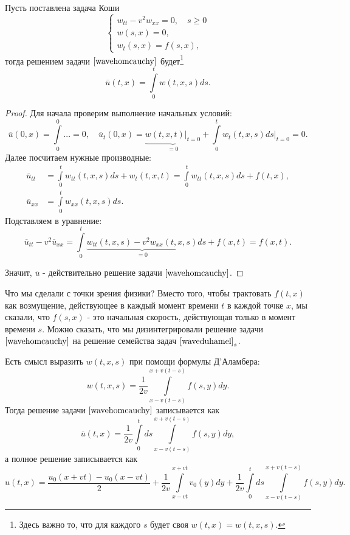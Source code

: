 \begin{theorem}[Дюамель] Пусть поставлена задача Коши
\begin{equation}
	\begin{cases}
		w_{tt} - v^2 w_{xx} = 0,\quad s \geq 0 \\
		w(s,x) = 0, \\
		w_t(s,x) = f(s,x),
	\end{cases}
\label{waveduhamel}
\end{equation}
тогда решением задачи $\eqref{wavehomcauchy}$ будет\footnote{Здесь важно то, что для каждого $s$ будет своя $w(t,x) = w(t,x,s)$.}
$$ \overline{u}(t,x) = \int \limits_0^t w(t,x,s) ds.$$
\end{theorem}
\begin{proof}
Для начала проверим выполнение начальных условий:
$$\overline{u} (0,x) = \int \limits_0^0 ... = 0, \quad \overline{u}_t (0,x) = \underbrace {w(t,x,t) \Bigg\rvert_{t=0}}_{= 0} + \int \limits_0^t w_t(t,x,s)ds \Bigg\rvert_{t=0} = 0.$$
Далее посчитаем нужные производные:
\begin{align*}
	\overline{u}_{tt} &= \int \limits_0^t w_{tt} (t,x,s) ds + w_t (t, x, t) = \int \limits_0^t w_{tt} (t,x,s)ds + f(t,x), \\
	\overline{u}_{xx} &= \int \limits_0^t w_{xx} (t,x,s) ds.
\end{align*}
Подставляем в уравнение:
$$ \overline{u}_{tt} - v^2 \overline{u}_{xx} = \int \limits_0^t \underbrace{w_{tt}(t,x,s) - v^2 w_{xx}(t,x,s)}_{= 0} ds + f(x,t) = f(x,t).$$

Значит, $\overline{u}$ - действительно решение задачи $\eqref{wavehomcauchy}$.

\end{proof}
Что мы сделали с точки зрения физики? Вместо того, чтобы трактовать $f(t,x)$ как возмущение, действующее в каждый момент времени $t$ в каждой точке $x$, мы сказали, что $f(s,x)$ - это начальная скорость, действующая только в момент времени $s$. Можно сказать, что мы дизинтегрировали решение задачи $\eqref{wavehomcauchy}$ на решение семейства задач $\eqref{waveduhamel}_s$.

Есть смысл выразить $w(t,x,s)$ при помощи формулы Д'Аламбера:
$$ w(t,x,s) = \frac {1} {2v} \int \limits_{x-v(t-s)}^{x+v(t-s)} f(s,y) dy. $$
Тогда решение задачи  $\eqref{wavehomcauchy}$ записывается как
$$ \overline{u} (t,x) = \frac {1} {2v} \int \limits_0^t ds \int \limits_{x-v(t-s)}^{x+v(t-s)} f(s,y) dy,$$
а полное решение записывается как $$u(t,x) = \frac {u_0 (x+vt) - u_0 (x-vt)} {2} + \frac {1} {2v} \int \limits_{x-vt}^{x+vt} v_0(y)dy + \frac {1} {2v} \int \limits_0^t ds \int \limits_{x-v(t-s)}^{x+v(t-s)} f(s,y) dy.$$

